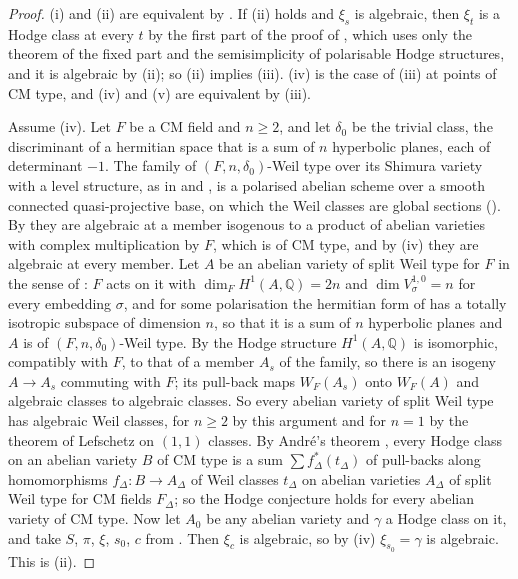 \documentclass[11pt,reqno]{amsart}
\theoremstyle{plain}
\theoremstyle{definition}
\theoremstyle{remark}
\newcommand{\QQ}{\mathbb{Q}}
\begin{document}
\begin{proof}
(i) and (ii) are equivalent by . If (ii) holds and
$\xi_{s}$ is algebraic, then $\xi_{t}$ is a Hodge class at every $t$ by the
first part of the proof of , which uses only the theorem of
the fixed part and the semisimplicity of polarisable Hodge structures, and it
is algebraic by (ii); so (ii) implies (iii). (iv) is the case of (iii) at
points of CM type, and
(iv) and (v) are equivalent by (iii).

Assume (iv). Let $F$ be a CM field and $n\ge2$, and let $\delta_{0}$ be the
trivial class, the discriminant of a hermitian space that is a sum of $n$
hyperbolic planes, each of determinant $-1$. The family of
$(F,n,\delta_{0})$-Weil type over its Shimura variety with a level structure,
as in \cite[Setup~17.1]{paperI} and \cite[Setup~16.1]{paperI}, is a polarised abelian
scheme over a smooth connected quasi-projective base, on which the Weil
classes are global sections (\cite[Proposition~17.3(i)]{paperI}). By \cite[Theorem~1.1(i)]{paperI}
they are algebraic at a member isogenous to a product of abelian varieties
with complex multiplication by $F$, which is of CM type, and by (iv) they are
algebraic at every member. Let $A$ be an abelian variety of split Weil type
for $F$ in the sense of \cite[\S2.1]{Mil20}: $F$ acts on it with
$\dim_{F}H^{1}(A,\QQ)=2n$ and $\dim V_{\sigma}^{1,0}=n$ for every embedding
$\sigma$, and for some polarisation the hermitian form of
\cite[Remark~17.2]{paperI} has a totally isotropic subspace of dimension $n$, so
that it is a sum of $n$ hyperbolic planes and $A$ is of
$(F,n,\delta_{0})$-Weil type. By \cite[Proposition~17.3(iv)]{paperI} the Hodge structure
$H^{1}(A,\QQ)$ is isomorphic, compatibly with $F$, to that of a member $A_{s}$
of the family, so there is an isogeny $A\to A_{s}$ commuting with $F$; its
pull-back maps $W_{F}(A_{s})$ onto $W_{F}(A)$ and algebraic classes to
algebraic classes. So every abelian variety of split Weil type has algebraic
Weil classes, for $n\ge2$ by this argument and for $n=1$ by the theorem of
Lefschetz on $(1,1)$ classes. By Andr\'e's theorem
\cite[Theorem~1 and its proof]{Mil20}, every Hodge class on an abelian
variety $B$ of CM type is a sum $\sum f_{\Delta}^{*}(t_{\Delta})$ of
pull-backs along homomorphisms $f_{\Delta}\colon B\to A_{\Delta}$ of Weil
classes $t_{\Delta}$ on abelian varieties $A_{\Delta}$ of split Weil type
for CM fields $F_{\Delta}$; so the Hodge conjecture holds for every abelian
variety of CM type. Now let $A_{0}$ be any abelian variety and $\gamma$ a
Hodge class on it, and take $S$, $\pi$, $\xi$, $s_{0}$, $c$ from
. Then $\xi_{c}$ is algebraic, so by (iv)
$\xi_{s_{0}}=\gamma$ is algebraic. This is (ii).
\end{proof}
\end{document}
